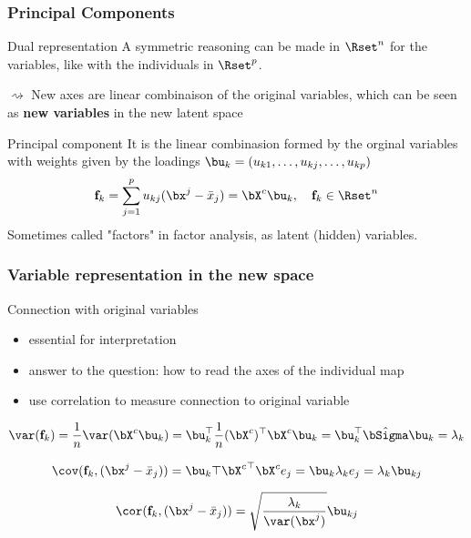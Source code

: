 \begin{frame}
  \frametitle{Principal Components}
  
  \begin{block}{Dual representation}
    A symmetric reasoning can be made in $\Rset^n$ for the variables, like with the individuals in $\Rset^p$.
    
    $\rightsquigarrow$ New axes are linear combinaison of the original variables, which can be seen as \alert{\bf new variables} in the new latent space
  \end{block}

  \begin{block}{Principal component}
    It is the linear combinasion formed by the orginal variables with weights given by the loadings $\bu_k = (u_{k1}, \dots, u_{kj}, \dots, u_{kp})$
    \begin{equation*}
      \mathbf{f}_{k}  = \sum_{j=1}^p u_{kj} (\bx^{j} - \bar{x}_j) = \bX^c \bu_k, \quad \mathbf{f}_k \in \Rset^n
    \end{equation*}
    Sometimes called \alert{"factors"} in  factor analysis, as \alert{latent (hidden) variables}. 
  \end{block}

\end{frame}

\begin{frame}
  \frametitle{Variable representation in the new space}
  
  \begin{block}{Connection with original variables}
    \begin{itemize}
      \item essential for interpretation
      \item answer to the question: how to read the axes of the individual map
      \item use correlation to measure connection to original variable
    \end{itemize}
  \end{block}

  \begin{equation*}
    \var(\mathbf{f}_k) = \frac{1}{n}\var(\bX^c \bu_k) = \bu_k^\top \frac{1}{n}(\bX^c)^\top \bX^c \bu_k =  \bu_k^\top \hat{\bSigma} \bu_k = \lambda_k
  \end{equation*}
  
  \begin{equation*}
    \cov(\mathbf{f}_k, (\bx^j - \bar{x}_j)) = \bu_k \top {\bX^c}^\top \bX^c e_j = \bu_k \lambda_k e_j = \lambda_k \bu_{kj}   
  \end{equation*}

  \begin{equation*}
    \cor(\mathbf{f}_k, (\bx^j - \bar{x}_j)) =  \sqrt{\frac{\lambda_k}{\var(\bx^j)}}\bu_{kj}
  \end{equation*}
  
\end{frame}

